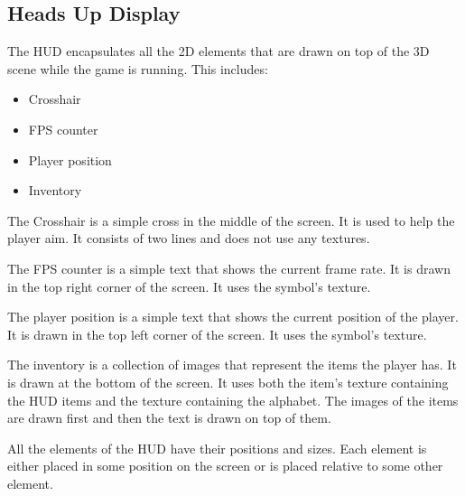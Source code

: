 \subsection{Heads Up Display} \label{sec:hud}
The HUD encapsulates all the 2D elements that are drawn on top of the 3D scene while the game is running.
This includes:
\begin{itemize}
    \item Crosshair
    \item FPS counter
    \item Player position
    \item Inventory
\end{itemize}

The Crosshair is a simple cross in the middle of the screen.
It is used to help the player aim.
It consists of two lines and does not use any textures.

The FPS counter is a simple text that shows the current frame rate.
It is drawn in the top right corner of the screen.
It uses the symbol's texture.

The player position is a simple text that shows the current position of the player.
It is drawn in the top left corner of the screen.
It uses the symbol's texture.

The inventory is a collection of images that represent the items the player has.
It is drawn at the bottom of the screen.
It uses both the item's texture containing the HUD items and the texture containing the alphabet.
The images of the items are drawn first and then the text is drawn on top of them.

All the elements of the HUD have their positions and sizes.
Each element is either placed in some position on the screen or is placed relative to some other element.